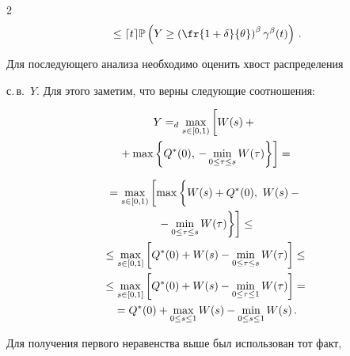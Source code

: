\begin{multicols}{2}
\begin{multline}
{}\leq \lceil t \rceil \mathbb{P} \left(Y \geq \left(\fr{1+\delta}{\theta}\right)^\beta 


\gamma^\beta(t) \right)\,. 


\label{asymp1-l6}


\end{multline}


Для последующего анализа необходимо оценить хвост распределения


с.\,в.~$Y$. Для этого заметим, что верны следующие соотношения:


\begin{multline*}


Y =_d\max\limits_{s \in [0,1)} \left[ \vphantom{\max\limits_{s \in [0,1)}}


W(s)+{}\right.\\


\left.{}+\max\left\{Q^*(0),\,


-\min\limits_{0 \leq \tau \leq s}W(\tau)   \right\}\right]={}


\end{multline*}





\noindent


\begin{multline}


{}=\max\limits_{s \in [0,1)} \left[ \max\left\{  


\vphantom{\max\limits_{s \in [0,1)}}


W(s)+Q^*(0),\,\,W(s)-{}\right.\right.\\


\left.\left.{}-\min\limits_{0\leq \tau \leq s}W(\tau) \right\} \right]\leq{}\\


{}\leq \max\limits_{s \in [0,1]} \left[ Q^*(0)+W(s)-\min_{0 \leq \tau \leq s}W(\tau) \right]


\leq{}\\


{}\leq \max\limits_{s \in [0,1]} \left[ Q^*(0)+W(s)-\min_{0 \leq \tau


\leq 1}W(\tau) \right]={}\\


{}= Q^*(0)+\max\limits_{0 \leq s \leq 1}W(s)-\min_{0 \leq s \leq 1} W(s)\,.


\label{asymp1-l5}


\end{multline}


Для получения первого неравенства выше был использован тот факт,



\end{multicols}
